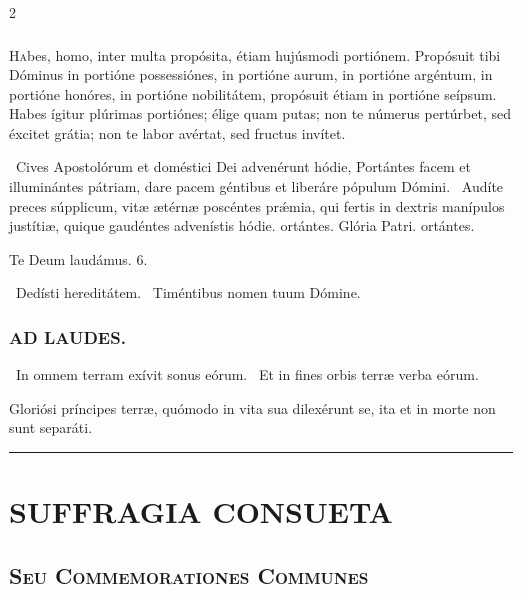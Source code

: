 \documentclass[9pt,twoside]{extarticle}
\begin{document}
\begin{multicols}{2}
{{\subsubsection*{\center {}}
\lettrine{H}abes, homo, inter multa propósita, étiam hujúsmodi portiónem. Propósuit tibi Dóminus in portióne possessiónes, in portióne aurum, in portióne argéntum, in portióne honóres, in portióne nobilitátem, propósuit étiam in portióne seípsum. Habes ígitur plúrimas portiónes; élige quam putas; non te númerus pertúrbet, sed éxcitet grátia; non te labor avértat, sed fructus invítet.

\begin{tightlist}{}
\item {}~Cives Apostolórum et doméstici Dei advenérunt hódie, \textred{*} Portántes facem et illuminántes pátriam, dare pacem géntibus et liberáre pópulum Dómini. ~Audíte preces súpplicum, vitæ ætérnæ poscéntes prǽmia, qui fertis in dextris manípulos justítiæ, quique gaudéntes advenístis hódie. ortántes. Glória Patri. ortántes.
\item Te Deum laudámus. 6.
\item {}~Dedísti hereditátem. ~Timéntibus nomen tuum Dómine.
\end{tightlist}

\subsubsection*{\center \textsc{AD LAUDES.}}
\begin{tightlist}{}
\item {}~In omnem terram exívit sonus eórum. ~Et in fines orbis terræ verba eórum.
\item {} Gloriósi príncipes terræ, quómodo in vita sua dilexérunt se, ita et in morte non sunt separáti.
\end{tightlist}

\begin{center}\textcolor{red}{\rule{\linewidth}{0.5pt}} \end{center}
\clearpage
\section*{\center \textsc{SUFFRAGIA CONSUETA}}
\subsection*{\center \textsc{Seu Commemorationes Communes}}

}}
\end{multicols}
\end{document}
